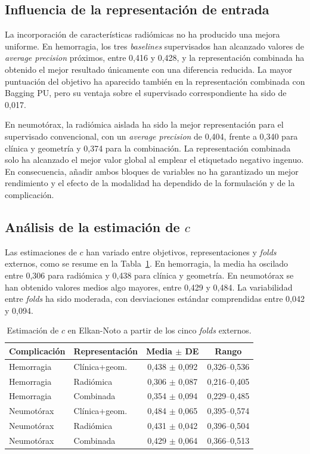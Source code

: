 \subsection{Influencia de la representación de entrada}

La incorporación de características radiómicas no ha producido una mejora uniforme. En hemorragia, los tres \textit{baselines} supervisados han alcanzado valores de \textit{average precision} próximos, entre 0,416 y 0,428, y la representación combinada ha obtenido el mejor resultado únicamente con una diferencia reducida. La mayor puntuación del objetivo ha aparecido también en la representación combinada con Bagging PU, pero su ventaja sobre el supervisado correspondiente ha sido de 0,017.

En neumotórax, la radiómica aislada ha sido la mejor representación para el supervisado convencional, con un \textit{average precision} de 0,404, frente a 0,340 para clínica y geometría y 0,374 para la combinación. La representación combinada solo ha alcanzado el mejor valor global al emplear el etiquetado negativo ingenuo. En consecuencia, añadir ambos bloques de variables no ha garantizado un mejor rendimiento y el efecto de la modalidad ha dependido de la formulación y de la complicación.

\subsection{Análisis de la estimación de \(c\)}

Las estimaciones de \(c\) han variado entre objetivos, representaciones y \textit{folds} externos, como se resume en la Tabla~\ref{tab:pu_estimacion_c}. En hemorragia, la media ha oscilado entre 0,306 para radiómica y 0,438 para clínica y geometría. En neumotórax se han obtenido valores medios algo mayores, entre 0,429 y 0,484. La variabilidad entre \textit{folds} ha sido moderada, con desviaciones estándar comprendidas entre 0,042 y 0,094.

\begin{table}[!htbp]
\centering
\caption{Estimación de \(c\) en Elkan-Noto a partir de los cinco \textit{folds} externos.}
\label{tab:pu_estimacion_c}
\small
\begin{tabular}{llcc}
\toprule
\textbf{Complicación} & \textbf{Representación} & \textbf{Media $\pm$ DE} & \textbf{Rango} \\
\midrule
Hemorragia & Clínica+geom. & 0,438 $\pm$ 0,092 & 0,326--0,536 \\
Hemorragia & Radiómica & 0,306 $\pm$ 0,087 & 0,216--0,405 \\
Hemorragia & Combinada & 0,354 $\pm$ 0,094 & 0,229--0,485 \\
\midrule
Neumotórax & Clínica+geom. & 0,484 $\pm$ 0,065 & 0,395--0,574 \\
Neumotórax & Radiómica & 0,431 $\pm$ 0,042 & 0,396--0,504 \\
Neumotórax & Combinada & 0,429 $\pm$ 0,064 & 0,366--0,513 \\
\bottomrule
\end{tabular}
\end{table}

